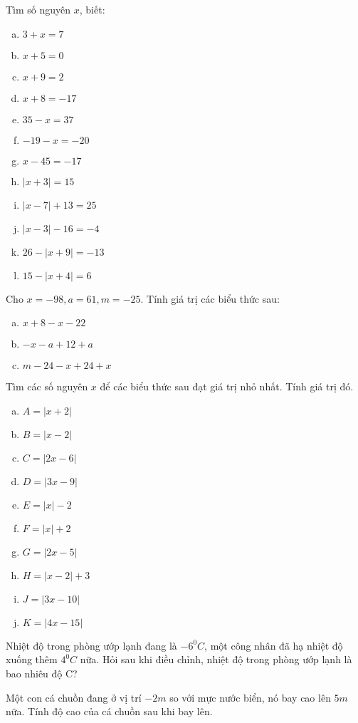 \begin{bt}
\end{bt}   \begin{bt}
Tìm số nguyên $x$, biết:
\begin{multicols}{2}
\begin{enumerate}[a)]
\item $3+x=7$
\item $x+5 =0$
\item $x+9=2$
\item $x+8=-17$
\item $35-x=37$
\item $-19-x=-20$
\item $x-45=-17$
\item $|x+3|=15$
\item $|x-7|+ 13 = 25$
\item $|x-3| - 16 = -4$
\item $26-|x+9| = -13$
\item $15- | x+4|=6$
\end{enumerate}
\end{multicols}

\end{bt}   \begin{bt}
Cho $x=-98, a= 61, m =-25.$ Tính giá trị các biểu thức sau:
\begin{enumerate}[a)]
\item $x+8-x-22$
\item $-x-a+12+a$
\item $m-24-x+24+x$
\end{enumerate}

\end{bt}   \begin{bt} 
Tìm các số nguyên $x$ để các biểu thức sau đạt giá trị nhỏ nhất. Tính giá trị đó.
\begin{multicols}{2}
\begin{enumerate}[a)]
\item $A=|x+2|$
\item $B=|x-2|$
\item $C=|2x-6|$
\item $D=|3x-9|$
\item $E =|x|-2$
\item $F=|x|+2$
\item $G=|2x-5|$
\item $H = |x-2| + 3$
\item $J = |3x - 10|$
\item $K = |4x - 15|$
\end{enumerate} 
\end{multicols}

\end{bt}   \begin{bt}
Nhiệt độ trong phòng ướp lạnh đang là $- 6^0C$, một công nhân đã hạ nhiệt độ xuống thêm $4^0C$ nữa. Hỏi sau khi điều chỉnh, nhiệt độ trong phòng ướp lạnh là bao nhiêu độ C?
\end{bt}   \begin{bt}
Một con cá chuồn đang ở vị trí $- 2m$ so với mực nước biển, nó bay cao lên $5m$ nữa. Tính độ cao của cá chuồn sau khi bay lên.

\end{bt}